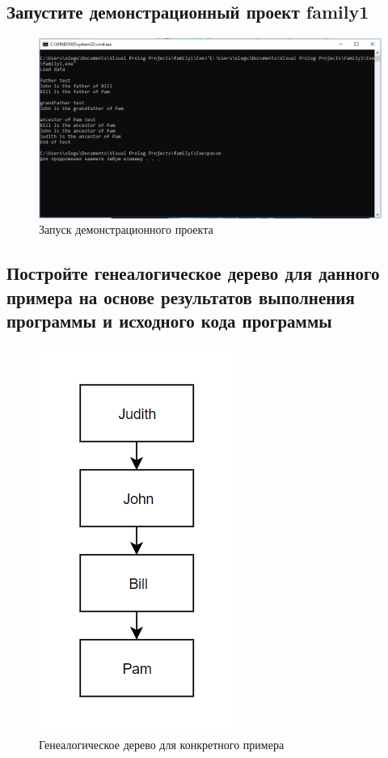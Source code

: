 \documentclass[14pt,a4paper,report]{report}
\begin{document}
\subsection{Запустите демонстрационный проект family1}

\begin{figure}[h!]
	\centering
	\includegraphics[scale = 0.6]{images/1.png}
	\caption{Запуск демонстрационного проекта}
\end{figure}

\subsection{Постройте генеалогическое дерево для данного примера на основе результатов выполнения программы и исходного кода программы}

\begin{figure}[h!]
	\centering
	\includegraphics[scale = 0.6]{images/2.png}
	\caption{Генеалогическое дерево для конкретного примера}
\end{figure}
\end{document}

